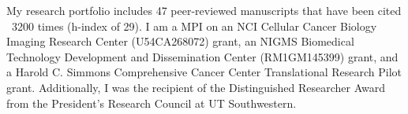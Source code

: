 My research portfolio includes 47 peer-reviewed manuscripts that have been cited ~3200 times (h-index of 29). I am a MPI on an NCI Cellular Cancer Biology Imaging Research Center (U54CA268072) grant, an NIGMS Biomedical Technology Development and Dissemination Center (RM1GM145399) grant, and a Harold C. Simmons Comprehensive Cancer Center Translational Research Pilot grant. Additionally, I was the recipient of the Distinguished Researcher Award from the President’s Research Council at UT Southwestern.

